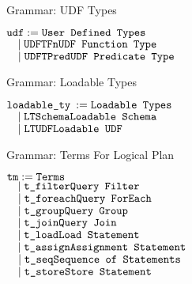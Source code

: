 \begin{frame}{Grammar: UDF Types}
\centering
	\begin{flushleft}
	$ \texttt{udf} := \hfill \texttt{User Defined Types}\hfill$\\
	$ \quad \mid \texttt{UDFTFn}\hfill \texttt{UDF Function Type}\hfill$\\
   	$ \quad \mid \texttt{UDFTPred} \hfill \texttt{UDF Predicate Type}\hfill$\\
	\end{flushleft}
\end{frame}

\begin{frame}{Grammar: Loadable Types}
\centering
	\begin{flushleft}
	$ \texttt{loadable\_ty} \::= \hfill \texttt{Loadable Types}\hfill$\\
	$ \quad \mid \texttt{LTSchema}\hfill \texttt{Loadable Schema}\hfill$\\
   	$ \quad \mid \texttt{LTUDF} \hfill \texttt{Loadable UDF}\hfill$\\
	\end{flushleft}
\end{frame}

\begin{frame}{Grammar: Terms For Logical Plan}
\centering
	\begin{flushleft}
	$ \texttt{tm} := \hfill \texttt{Terms}\hfill$\\
	$ \quad \mid \texttt{t\_filter}\hfill \texttt{Query Filter}\hfill$\\
   	$ \quad \mid \texttt{t\_foreach} \hfill \texttt{Query ForEach}\hfill$\\
    $ \quad \mid \texttt{t\_group} \hfill \texttt{Query Group}\hfill$\\
    $ \quad \mid \texttt{t\_join} \hfill \texttt{Query Join}\hfill$\\
    $ \quad \mid \texttt{t\_load} \hfill \texttt{Load Statement}\hfill$\\
   	$ \quad \mid \texttt{t\_assign} \hfill \texttt{Assignment Statement}\hfill$\\
    $ \quad \mid \texttt{t\_seq} \hfill \texttt{Sequence of Statements}\hfill$\\
    $ \quad \mid \texttt{t\_store} \hfill \texttt{Store Statement}\hfill$\\
	\end{flushleft}
\end{frame}

